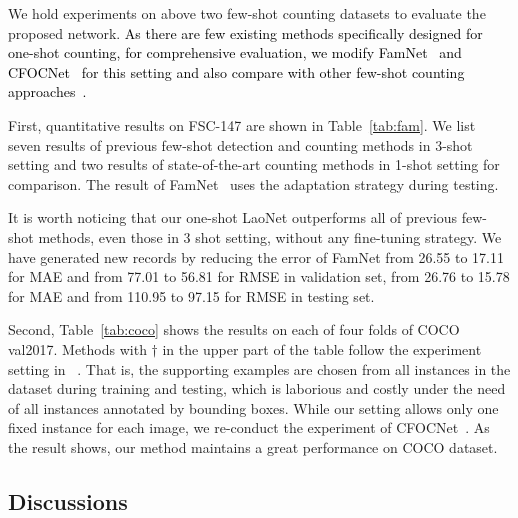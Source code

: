\documentclass{article}
\newcommand\XP[1]{\textcolor{black}{#1}}%
\begin{document}
We hold experiments on above two few-shot counting datasets to evaluate the proposed network. \XP{As there are few existing methods specifically designed for one-shot counting, for comprehensive evaluation, we modify FamNet~\cite{ranjan2021learning} and CFOCNet~\cite{yang2021class} for this setting and also compare with other few-shot counting approaches~\cite{kang2019few, fan2020few, lu2018class, finn2017model, michaelis2018one}.}

First, quantitative results on FSC-147 are shown in Table~\ref{tab:fam}. We list seven results of previous few-shot detection and counting methods in 3-shot setting and two results of state-of-the-art counting methods in 1-shot setting for comparison. The result of FamNet~\cite{ranjan2021learning} uses the adaptation strategy during testing.

It is worth noticing that our one-shot LaoNet outperforms all of previous few-shot methods, even those in 3 shot setting, without any fine-tuning strategy. We have generated new records by reducing the error of FamNet from 26.55 to 17.11 for MAE and from 77.01 to 56.81 for RMSE in validation set, from 26.76 to 15.78 for MAE and from 110.95 to 97.15 for RMSE in testing set.

Second, Table~\ref{tab:coco} shows the results on each of four folds of COCO val2017. Methods with $\dag$ in the upper part of the table follow the experiment setting in ~\cite{yang2021class}. That is, the supporting examples are chosen from all instances in the dataset during training and testing, which is laborious and costly under the need of all instances annotated by bounding boxes. While our setting allows only one fixed instance for each image, we re-conduct the experiment of CFOCNet~\cite{yang2021class}. As the result shows, our method maintains a great performance on COCO dataset.

\subsection{Discussions}
\end{document}
